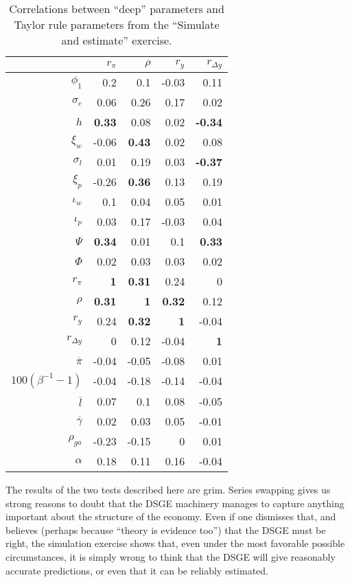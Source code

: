 \documentclass[11pt]{article}
\begin{document}
\begin{table}

\caption{\label{tab:covary-with-Taylor}Correlations between ``deep'' parameters and Taylor rule parameters from the ``Simulate and estimate'' exercise.}
\centering
\begin{tabular}[t]{rrrrr}
\toprule
 & $r_\pi$ & $\rho$ & $r_y$ & $r_{\Delta y}$\\
\midrule
$\phi_1$ & 0.2 & 0.1 & -0.03 & 0.11\\
$\sigma_c$ & 0.06 & 0.26 & 0.17 & 0.02\\
$h$ & \textbf{0.33} & 0.08 & 0.02 & \textbf{-0.34}\\
$\xi_w$ & -0.06 & \textbf{0.43} & 0.02 & 0.08\\
$\sigma_l$ & 0.01 & 0.19 & 0.03 & \textbf{-0.37}\\
\addlinespace
$\xi_p$ & -0.26 & \textbf{0.36} & 0.13 & 0.19\\
$\iota_w$ & 0.1 & 0.04 & 0.05 & 0.01\\
$\iota_p$ & 0.03 & 0.17 & -0.03 & 0.04\\
$\Psi$ & \textbf{0.34} & 0.01 & 0.1 & \textbf{0.33}\\
$\Phi$ & 0.02 & 0.03 & 0.03 & 0.02\\
\addlinespace
$r_\pi$ & \textbf{1} & \textbf{0.31} & 0.24 & 0\\
$\rho$ & \textbf{0.31} & \textbf{1} & \textbf{0.32} & 0.12\\
$r_y$ & 0.24 & \textbf{0.32} & \textbf{1} & -0.04\\
$r_{\Delta y}$ & 0 & 0.12 & -0.04 & \textbf{1}\\
$\overline{\pi}$ & -0.04 & -0.05 & -0.08 & 0.01\\
\addlinespace
$100(\beta^{-1} -1)$ & -0.04 & -0.18 & -0.14 & -0.04\\
$\overline{l}$ & 0.07 & 0.1 & 0.08 & -0.05\\
$\overline{\gamma}$ & 0.02 & 0.03 & 0.05 & -0.01\\
$\rho_{ga}$ & -0.23 & -0.15 & 0 & 0.01\\
$\alpha$ & 0.18 & 0.11 & 0.16 & -0.04\\
\bottomrule
\end{tabular}
\end{table}

The results of the two tests described here are grim. Series swapping
gives us strong reasons to doubt that the DSGE machinery manages to
capture anything important about the structure of the economy. Even if
one dismisses that, and believes (perhaps because ``theory is evidence
too'') that the DSGE must be right, the simulation exercise shows that,
even under the most favorable possible circumstances, it is simply wrong
to think that the DSGE will give reasonably accurate predictions, or
even that it can be reliably estimated.
\end{document}
